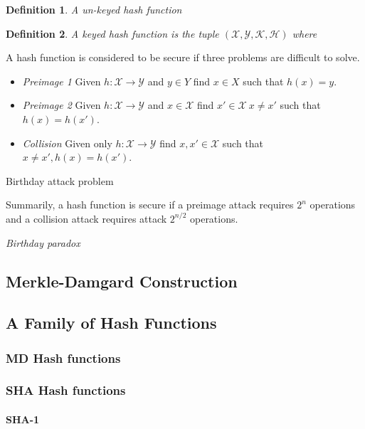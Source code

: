 \documentclass{article}
\theoremstyle{quest}
\newtheorem*{definition}{Definition}
\newcommand{\Hsh}{\mathcal{H}}
\newcommand{\K}{\mathcal{K}}
\newcommand{\X}{\mathcal{X}}
\newcommand{\Y}{\mathcal{Y}}
\begin{document}
\begin{definition}
	A \textit{un-keyed hash function}
\end{definition}

\begin{definition}
	A \textit{keyed hash function} is the tuple $(\X,\Y,\K,\Hsh)$ where
\end{definition}

A hash function is considered to be secure if three problems are difficult to solve.
\begin{itemize}
	\item \textit{Preimage 1}
		Given $h : \X \rightarrow \Y$
		and $y \in Y$
		find $x \in X$
		such that $h(x) = y$.
	\item \textit{Preimage 2}
		Given $h : \X \rightarrow \Y$
		and $x \in \X$
		find $x\prime \in \X\ x \neq x\prime$
		such that $h(x) = h(x\prime)$.
	\item \textit{Collision}
		Given only $h : \X \rightarrow \Y$
		find $x, x\prime \in \X$
		such that $x \neq x\prime, h(x) = h(x\prime)$.
\end{itemize}

Birthday attack problem

Summarily, a hash function is secure if
a preimage attack requires $2^n$ operations and
a collision attack requires attack $2^{n/2}$ operations.

\textit{Birthday paradox}

\subsection{Merkle-Damgard Construction}

\subsection{A Family of Hash Functions}

\subsubsection{MD Hash functions}

\subsubsection{SHA Hash functions}

\paragraph{SHA-1}
\end{document}
